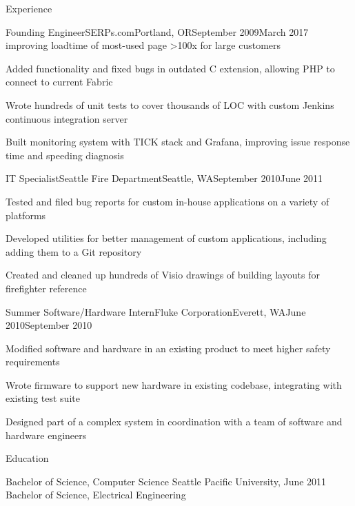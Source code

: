 \documentclass[letterpaper,10pt]{article}
\begin{document}
\begin{res_section}{Experience}
\begin{res_experienceitem}{Founding Engineer}{SERPs.com}{Portland, OR}{September 2009}{March 2017}
        improving loadtime of most-used page \textgreater100x for large customers
  \item Added functionality and fixed bugs in outdated C extension, allowing PHP to connect to current Fabric
  \item Wrote hundreds of unit tests to cover thousands of LOC with custom Jenkins continuous integration server
  \item Built monitoring system with TICK stack and Grafana, improving issue response time and speeding diagnosis
\end{res_experienceitem}
\begin{res_experienceitem}{IT Specialist}{Seattle Fire Department}{Seattle, WA}{September 2010}{June 2011}
  \item Tested and filed bug reports for custom in-house applications on a variety of platforms
  \item Developed utilities for better management of custom applications, including adding them to a Git repository
  \item Created and cleaned up hundreds of Visio drawings of building layouts for firefighter reference
\end{res_experienceitem}
\begin{res_experienceitem}{Summer Software/Hardware Intern}{Fluke Corporation}{Everett, WA}{June 2010}{September 2010}
  \item Modified software and hardware in an existing product to meet higher safety requirements
  \item Wrote firmware to support new hardware in existing codebase, integrating with existing test suite
  \item Designed part of a complex system in coordination with a team of software and hardware engineers
\end{res_experienceitem}
\end{res_section}

\begin{res_section}{Education}
\begin{res_content}{Bachelor of Science, Computer Science
  \textnormal{
      \sffamily
      \normalsize
      \hfill
      Seattle Pacific University, June 2011}\\
  Bachelor of Science, Electrical Engineering
}
\end{res_content}
\end{res_section}
\end{document}
